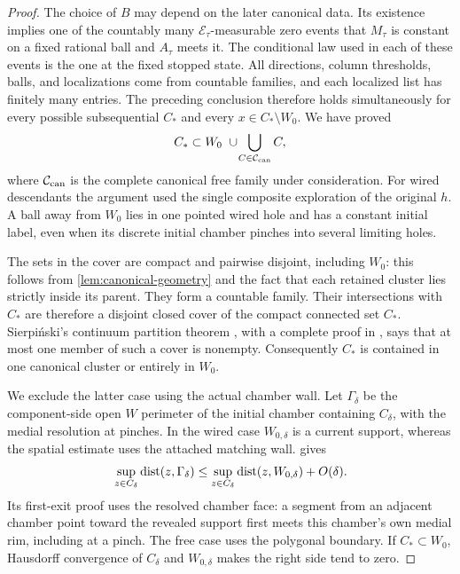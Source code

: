 \begin{proof}
The choice of \(B\) may depend on the later canonical data. Its
existence implies one of the countably many
\(\mathscr E_\tau\)-measurable zero events that \(M_\tau\) is constant
on a fixed rational ball and \(A_\tau\) meets it. The conditional law
used in each of these events is the one at the fixed stopped state.
All directions, column thresholds, balls, and localizations come from
countable families, and each localized list has finitely many entries.
The preceding conclusion therefore holds simultaneously for every
possible subsequential \(C_*\) and every \(x\in C_*\setminus W_0\).
We have proved
\begin{equation}
 C_*\subset W_0\ \cup\!\bigcup_{C\in\cC_{\rm can}}C,
 \label{eq:countable-cover}
\end{equation}
where \(\mathcal C_{\rm can}\) is the complete canonical free family under
consideration. For wired descendants the argument used the single
composite exploration of the original \(h\). A ball away from \(W_0\)
lies in one pointed wired hole and has a constant initial label, even
when its discrete initial chamber pinches into several limiting holes.

The sets in the cover are compact and pairwise disjoint, including
\(W_0\): this follows from \cref{lem:canonical-geometry} and the fact
that each retained cluster lies strictly inside its parent. They form
a countable family. Their intersections with \(C_*\) are therefore
a disjoint closed cover of the compact connected set \(C_*\).
Sierpi\'nski's continuum partition theorem \cite{Sierpinski1918},
with a complete proof in \cite[Chapter~V, Theorem~5.10]{Freiwald2014},
says that at most one member of such a cover is nonempty.
Consequently \(C_*\) is contained in one canonical cluster or entirely
in \(W_0\).

We exclude the latter case using the actual chamber wall.
Let \(\Gamma_\delta\) be the component-side open \(W\) perimeter of
the initial chamber containing \(C_\delta\), with the medial resolution
at pinches. In the wired case \(W_{0,\delta}\) is a current support,
whereas the spatial estimate uses the attached matching wall.
 gives
\[
 \sup_{z\in C_\delta}\operatorname{dist}(z,\Gamma_\delta)
 \leq \sup_{z\in C_\delta}\operatorname{dist}(z,W_{0,\delta})+O(\delta).
\]
Its first-exit proof uses the resolved chamber face: a segment from
an adjacent chamber point toward the revealed support first meets
this chamber's own medial rim, including at a pinch. The free case
uses the polygonal boundary.
If \(C_*\subset W_0\), Hausdorff convergence of \(C_\delta\) and
\(W_{0,\delta}\) makes the right side tend to zero.


\end{proof}
